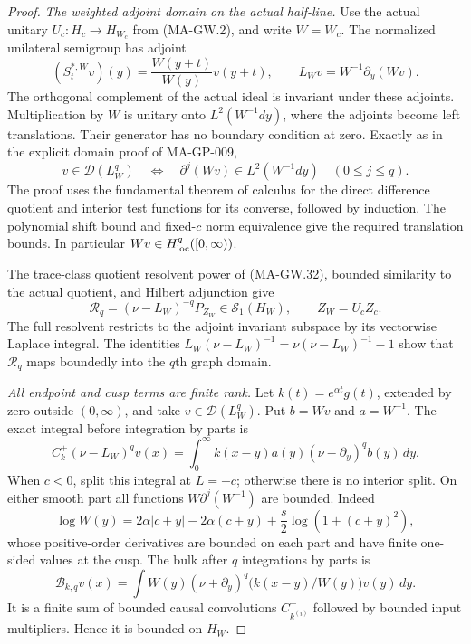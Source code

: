 \begin{proof}
\emph{The weighted adjoint domain on the actual half-line.}
Use the actual unitary $U_c:H_c\to H_{W_c}$ from
(MA-GW.2), and write $W=W_c$.
The normalized unilateral semigroup has adjoint
\[
 (S_t^{*,W}v)(y)=\frac{W(y+t)}{W(y)}v(y+t),
            \qquad L_Wv=W^{-1}\partial_y(Wv).
 \tag{MA-GW.37}
\]
The orthogonal complement of the actual ideal is invariant
under these adjoints.
Multiplication by $W$ is unitary onto $L^2(W^{-1}dy)$,
where the adjoints become left translations.
Their generator has no boundary condition at zero.
Exactly as in the explicit domain proof of MA-GP-009,
\[
 v\in\mathcal D(L_W^q)
 \quad\Longleftrightarrow\quad
 \partial^j(Wv)\in L^2(W^{-1}dy)\quad(0\le j\le q).
 \tag{MA-GW.38}
\]
The proof uses the fundamental theorem of calculus for
the direct difference quotient and interior test functions
for its converse, followed by induction.
The polynomial shift bound and fixed-$c$ norm equivalence
give the required translation bounds.
In particular $Wv\in H^q_{\rm loc}([0,\infty))$.

The trace-class quotient resolvent power of (MA-GW.32),
bounded similarity to the actual quotient, and Hilbert
adjunction give
\[
 \mathcal R_q=(\nu-L_W)^{-q}P_{Z_W}
                         \in\mathcal S_1(H_W),
                 \qquad Z_W=U_cZ_c .
 \tag{MA-GW.39}
\]
The full resolvent restricts to the adjoint invariant
subspace by its vectorwise Laplace integral.
The identities
$L_W(\nu-L_W)^{-1}=\nu(\nu-L_W)^{-1}-1$
show that $\mathcal R_q$ maps boundedly into the
$q$th graph domain.

\emph{All endpoint and cusp terms are finite rank.}
Let $k(t)=e^{\alpha t}g(t)$, extended by zero outside
$(0,\infty)$, and take $v\in\mathcal D(L_W^q)$.
Put $b=Wv$ and $a=W^{-1}$.
The exact integral before integration by parts is
\[
 C_k^+(\nu-L_W)^qv(x)
       =\int_0^\infty k(x-y)a(y)
                              (\nu-\partial_y)^q b(y)\,dy .
 \tag{MA-GW.40}
\]
When $c<0$, split this integral at $L=-c$; otherwise
there is no interior split.
On either smooth part all functions
$W\partial^j(W^{-1})$ are bounded.
Indeed
\[
 \log W(y)=2\alpha|c+y|-2\alpha(c+y)
                              +\frac{s}{2}\log(1+(c+y)^2),
 \tag{MA-GW.41}
\]
whose positive-order derivatives are bounded on each
part and have finite one-sided values at the cusp.
The bulk after $q$ integrations by parts is
\[
 \mathcal B_{k,q}v(x)
  =\int W(y)(\nu+\partial_y)^q
                         \bigl(k(x-y)/W(y)\bigr)v(y)\,dy .
 \tag{MA-GW.42}
\]
It is a finite sum of bounded causal convolutions
$C_{k^{(i)}}^+$ followed by bounded input multipliers.
Hence it is bounded on $H_W$.


\end{proof}
